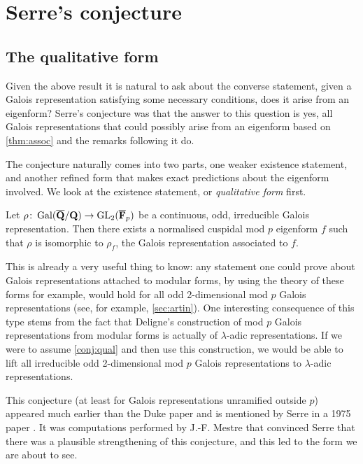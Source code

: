 \documentclass[a4paper,12pt]{article}
\begin{document}
\section{Serre's conjecture}
\subsection{The qualitative form}
Given the above result it is natural to ask about the converse statement, given a Galois representation satisfying some necessary conditions, does it arise from an eigenform?
Serre's conjecture was that the answer to this question is yes, all Galois representations that could possibly arise from an eigenform based on \cref{thm:assoc} and the remarks following it do.

The conjecture naturally comes into two parts, one weaker existence statement, and another refined form that makes exact predictions about the eigenform involved.
We look at the existence statement, or \emph{qualitative form} first.

\begin{conjecture}\label{conj:qual}
Let $\rho\colon \operatorname{Gal}(\overline{\mathbf{Q}}/\mathbf{Q}) \to \operatorname{GL}_2(\overline{\mathbf{F}}_p)$ be a continuous, odd, irreducible Galois representation.
Then there exists a normalised cuspidal mod $p$ eigenform $f$ such that $\rho$ is isomorphic to $\rho_f$, the Galois representation associated to $f$.
\end{conjecture}

This is already a very useful thing to know: any statement one could prove about Galois representations attached to  modular forms, by using the theory of these forms for example, would hold for all odd 2-dimensional mod $p$ Galois representations (see, for example, \cref{sec:artin}).
One interesting consequence of this type stems from the fact that Deligne's construction of mod $p$ Galois representations from modular forms is actually of $\lambda$-adic representations.
If we were to assume \cref{conj:qual} and then use this construction, we would be able to lift all irreducible odd 2-dimensional mod $p$ Galois representations to $\lambda$-adic representations.

This conjecture (at least for Galois representations unramified outside $p$) appeared much earlier than the Duke paper and is mentioned by Serre in a 1975 paper \cite[sec. 3]{Serre75}.
It was computations performed by J.-F. Mestre that convinced Serre that there was a plausible strengthening of this conjecture, and this led to the form we are about to see.
\end{document}
